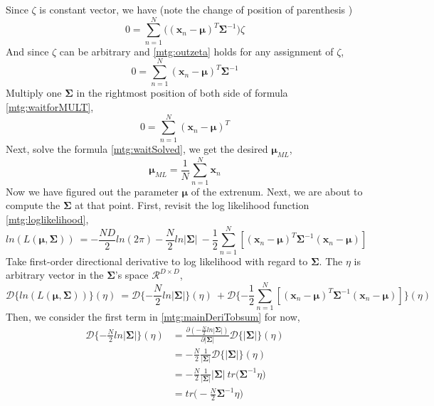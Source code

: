 \documentclass[11pt,a4paper]{article}
\newcommand{\htab}{\hspace*{0.63cm}}
\newcommand{\dd}[2]{\mathcal{D}\{ #1 \} (#2)}
\newcommand{\bmu}{\boldsymbol{\mu}}
\newcommand{\bsum}{\boldsymbol{\Sigma}}
\newcommand{\xnv}{\boldsymbol{x}_{n} }
\begin{document}
\htab Since $\zeta$ is constant vector, we have (note the change of position of parenthesis )
    \begin{equation} \label{mtg:outzeta}
        0 = \sum_{n=1}^{N}{ \Big( (\xnv-\bmu)^{T} \bsum^{-1}  \Big) \zeta }
    \end{equation}
\htab And since $\zeta$ can be arbitrary and \eqref{mtg:outzeta} holds for any assignment of $\zeta$, 
    \begin{equation} \label{mtg:waitforMULT}
        0 = \sum_{n=1}^{N}{  (\xnv-\bmu)^{T} \bsum^{-1} }
    \end{equation}
\htab Multiply one $\bsum$ in the rightmost position of both side of formula \eqref{mtg:waitforMULT}, 
    \begin{equation} \label{mtg:waitSolved}
        0 = \sum_{n=1}^{N}{  (\xnv-\bmu)^{T} }
    \end{equation}
\htab Next, solve the formula \eqref{mtg:waitSolved}, we get the desired $\bmu_{ML}$,
    \begin{equation} \label{mtg:muML} \bmu_{ML} = \frac{1}{N} \sum_{n=1}^{N} \xnv  \end{equation}
\htab Now we have figured out the parameter $\bmu$ of the extrenum. Next, we are about to compute the $\bsum$ at that point. First, revisit the log likelihood function \eqref{mtg:loglikelihood},
    \begin{equation}  
    ln(L(\bmu,\bsum)) \
    = -\frac{ND}{2}ln(2\pi) - \frac{N}{2} ln|\bsum| \ 
        -\frac{1}{2} \sum_{n=1}^{N} [ (\xnv-\bmu)^{T} \bsum^{-1} (\xnv-\bmu)] \ 
    \end{equation}
    \htab Take first-order directional derivative to log likelihood with regard to $\bsum$. The $\eta$ is arbitrary  vector in the $\bsum$'s space $\mathcal{R}^{D\times D}$, 
    \begin{equation} \label{mtg:mainDeriTobsum}
        \dd{ln(L(\bmu,\bsum))}{\eta} \
        = \dd{- \frac{N}{2} ln|\bsum|}{\eta} \ 
        + \dd{-\frac{1}{2} \sum_{n=1}^{N} [ (\xnv-\bmu)^{T} \bsum^{-1} (\xnv-\bmu)]}{\eta} \ 
    \end{equation}
\htab Then, we consider the first term in \eqref{mtg:mainDeriTobsum} for now,
        \begin{align}
            \dd{- \frac{N}{2} ln|\bsum|}{\eta} 
            & = \frac{\partial (-\frac{N}{2} ln|\bsum|)}{\partial |\bsum|} \dd{|\bsum|}{\eta} \\
            & = - \frac{N}{2} \frac{1}{|\bsum|} \dd{|\bsum|}{\eta} \\
            & = - \frac{N}{2} \frac{1}{|\bsum|} |\bsum|\ tr \big(\bsum^{-1} \eta\big) \\
            & =  tr \big(-\frac{N}{2} \bsum^{-1} \eta\big) \label{mtg:firstterm}
        \end{align}
\end{document}
